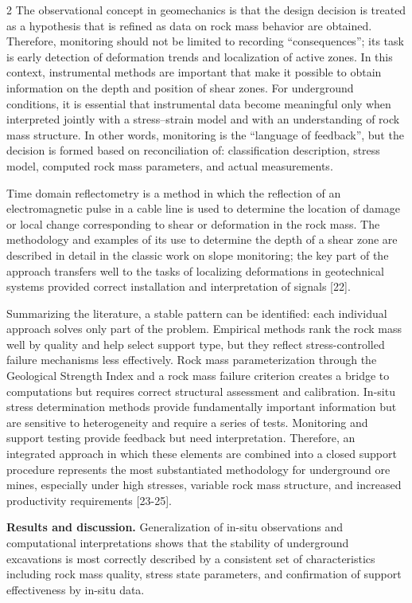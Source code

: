 \begin{multicols}{2}
The observational concept in geomechanics is that the design decision is
treated as a hypothesis that is refined as data on rock mass behavior
are obtained. Therefore, monitoring should not be limited to recording
``consequences''; its task is early detection of deformation trends and
localization of active zones. In this context, instrumental methods are
important that make it possible to obtain information on the depth and
position of shear zones. For underground conditions, it is essential
that instrumental data become meaningful only when interpreted jointly
with a stress--strain model and with an understanding of rock mass
structure. In other words, monitoring is the ``language of feedback'',
but the decision is formed based on reconciliation of: classification
description, stress model, computed rock mass parameters, and actual
measurements.

Time domain reflectometry is a method in which the reflection of an
electromagnetic pulse in a cable line is used to determine the location
of damage or local change corresponding to shear or deformation in the
rock mass. The methodology and examples of its use to determine the
depth of a shear zone are described in detail in the classic work on
slope monitoring; the key part of the approach transfers well to the
tasks of localizing deformations in geotechnical systems provided
correct installation and interpretation of signals {[}22{]}.

Summarizing the literature, a stable pattern can be identified: each
individual approach solves only part of the problem. Empirical methods
rank the rock mass well by quality and help select support type, but
they reflect stress-controlled failure mechanisms less effectively. Rock
mass parameterization through the Geological Strength Index and a rock
mass failure criterion creates a bridge to computations but requires
correct structural assessment and calibration. In-situ stress
determination methods provide fundamentally important information but
are sensitive to heterogeneity and require a series of tests. Monitoring
and support testing provide feedback but need interpretation. Therefore,
an integrated approach in which these elements are combined into a
closed support procedure represents the most substantiated methodology
for underground ore mines, especially under high stresses, variable rock
mass structure, and increased productivity requirements {[}23-25{]}.

{\bfseries Results and discussion.} Generalization of in-situ observations
and computational interpretations shows that the stability of
underground excavations is most correctly described by a consistent set
of characteristics including rock mass quality, stress state parameters,
and confirmation of support effectiveness by in-situ data.


\end{multicols}

